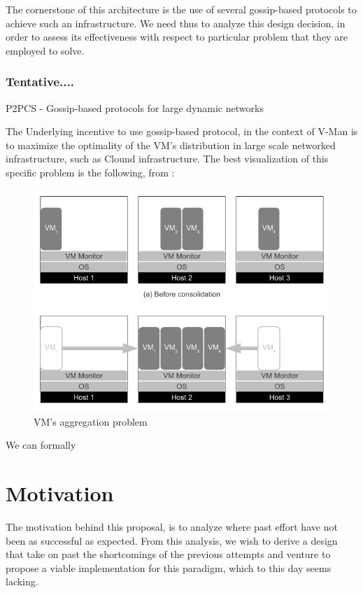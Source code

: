 \documentclass[11pt]{amsart}
\begin{document}
	The cornerstone of this architecture is the use of several gossip-based protocols to achieve such an 
	infrastructure. We need thus to analyze this design decision, in order to assess its effectiveness 
	with respect to particular problem that they are employed to solve.
	
	\subsubsection{Tentative....}
	P2PCS - Gossip-based protocols for large dynamic networks

	The Underlying incentive to use gossip-based protocol, in the context of V-Man 
	is to maximize the optimality of the VM's distribution in large scale networked 
	infrastructure, such as Clound infrastructure. The best visualization of this 
	specific problem is the following, from \cite{marzolla2011server}:
	
	\begin{center}
		\begin{figure}[h]
			\includegraphics[width=125mm]{p2pcs_vm_aggregation.png}
			\caption{VM's aggregation problem\label{p2pcs_vm}}
		\end{figure}
	\end{center}
	
	We can formally 
	\section{Motivation}
	The motivation behind this proposal, is to analyze where past effort have not been as successful
	as expected. From this analysis, we wish to derive a design that take on past the shortcomings of 
	the previous attempts and venture to propose a viable implementation for this paradigm, which to 
	this day seems lacking.
	
\end{document}
